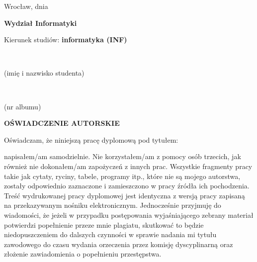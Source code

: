 
\makeatletter
{}

\begin{flushright}
    Wrocław, dnia \@when
  \end{flushright}

  \begin{flushleft}
    {\fontsize{14}{14} \selectfont
    
    \vspace*{20pt}
    {\bf Wydział Informatyki}
    
    \bigskip
    Kierunek studiów: {\bf informatyka (INF)}
    }  
  \vspace*{30pt}
  
  {~\@author} %
  \vspace*{-4pt}
  
  \makebox[220pt][r]{\dotfill} %

  \vspace*{-2pt}
  {\scriptsize (imię i nazwisko studenta)}

  \bigskip
  {~\@album} %
  
  \vspace*{-4pt}
  \makebox[220pt][r]{\dotfill} %
  
  \vspace*{-2pt}
  {\scriptsize (nr albumu)}
\end{flushleft}

  \bigskip

\begin{center}
  {\fontsize{16}{16} \selectfont \bf OŚWIADCZENIE AUTORSKIE}
\end{center}

\bigskip


    Oświadczam, że niniejszą pracę dyplomową pod tytułem:
    \begin{center}
        {\fontsize{16}{16} \selectfont \bf \@title}
    \end{center}
    napisałem/am samodzielnie. Nie korzystałem/am z pomocy osób trzecich, jak również nie dokonałem/am zapożyczeń z innych prac.
    \newline
    \newline
    \indent Wszystkie fragmenty pracy takie jak cytaty, ryciny, tabele, programy itp., które nie są mojego autorstwa, zostały odpowiednio zaznaczone i zamieszczono w pracy źródła ich pochodzenia. Treść wydrukowanej pracy dyplomowej jest identyczna z wersją pracy zapisaną na przekazywanym nośniku elektronicznym.
    \newline
    \newline
    \indent Jednocześnie przyjmuję do wiadomości, że jeżeli w przypadku postępowania wyjaśniającego zebrany materiał potwierdzi popełnienie przeze mnie plagiatu, skutkować to będzie niedopuszczeniem do dalszych czynności w sprawie nadania mi tytułu zawodowego do czasu wydania orzeczenia przez komisję dyscyplinarną oraz złożenie zawiadomienia o popełnieniu przestępstwa.

